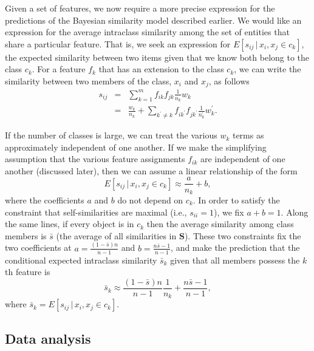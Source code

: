 \documentclass{apa}
\newcommand{\given}{\,|\,}
\newcommand{\mat}[1]{\mathbf{#1}}
\begin{document}
Given a set of features, we now require a more precise expression for the predictions of the Bayesian similarity model described earlier. We would like an expression for the average intraclass similarity among the set of entities that share a particular feature. That is, we seek an expression for $E[s_{ij} \given x_i,x_j \in c_k]$, the expected similarity between two items given that we know both belong to the class $c_k$. For a feature $f_k$ that has an extension to the class $c_k$, we can write the similarity between two members of the class, $x_i$ and $x_j$, as follows
\begin{eqnarray}
s_{ij} &=& \sum_{k=1}^m f_{ik} f_{jk}  \frac{1}{n_k}  w_k \\
&=& \frac{w_k}{n_k} + \sum_{k^\prime \neq k} f_{ik^\prime} f_{jk^\prime} \frac{1}{n_k^\prime} w_k^\prime. \label{splitcf}
\end{eqnarray}

If the number of classes is large, we can treat the various $w_k$ terms as approximately independent of one another. If we make the simplifying assumption that the various feature assignments $f_{ik}$ are independent of one another (discussed later), then we can assume a linear relationship of the form
\begin{equation}
E[s_{ij} \given x_i,x_j \in c_k] \approx \frac{a}{n_k} +b,
\end{equation}
where the coefficients $a$ and $b$ do not depend on $c_k$. In order to satisfy the constraint that self-similarities are maximal (i.e., $s_{ii}=1$), we fix $a+b=1$. Along the same lines, if every object is in $c_k$ then the average similarity among class members is $\bar{s}$ (the average of all similarities in $\mat{S}$). These two constraints fix the two coefficients at  $a=\frac{(1-\bar{s})n}{n-1}$ and $b=\frac{n\bar{s}-1}{n-1}$, and make the prediction that the conditional expected intraclass similarity $\bar{s}_k$ given that all members possess the $k$th feature is
\begin{equation}
\bar{s}_k \approx \frac{(1-\bar{s})n}{n-1} \frac{1}{n_k} + \frac{n\bar{s}-1}{n-1}, \label{sizespec}
\end{equation}
where $\bar{s}_k = E[s_{ij} \given x_i,x_j \in c_k]$.




\subsection{Data analysis}
\end{document}
